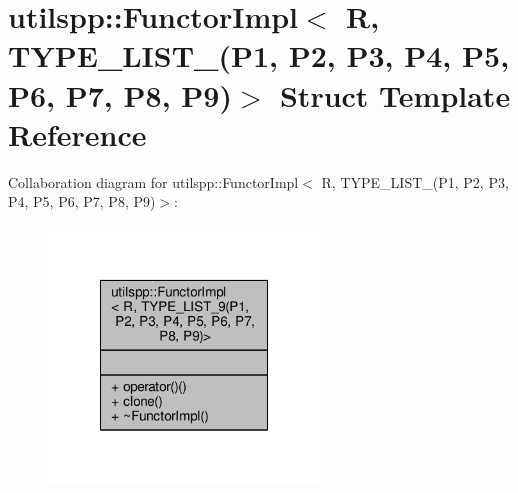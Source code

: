 \hypertarget{structutilspp_1_1FunctorImpl_3_01R_00_01TYPE__LIST__9_07P1_00_01P2_00_01P3_00_01P4_00_01P5_00_01P6_00_01P7_00_01P8_00_01P9_08_4}{\section{utilspp\-:\-:Functor\-Impl$<$ R, T\-Y\-P\-E\-\_\-\-L\-I\-S\-T\-\_(P1, P2, P3, P4, P5, P6, P7, P8, P9)$>$ Struct Template Reference}
\label{structutilspp_1_1FunctorImpl_3_01R_00_01TYPE__LIST__9_07P1_00_01P2_00_01P3_00_01P4_00_01P5_00_01P6_00_01P7_00_01P8_00_01P9_08_4}
}


Collaboration diagram for utilspp\-:\-:Functor\-Impl$<$ R, T\-Y\-P\-E\-\_\-\-L\-I\-S\-T\-\_(P1, P2, P3, P4, P5, P6, P7, P8, P9)$>$\-:
\nopagebreak
\begin{figure}[H]
\begin{center}
\leavevmode
\includegraphics[width=204pt]{structutilspp_1_1FunctorImpl_3_01R_00_01TYPE__LIST__9_07P1_00_01P2_00_01P3_00_01P4_00_01P5_00_010702735bf285b62ec4ce8aaa44cc07b8}
\end{center}
\end{figure}
